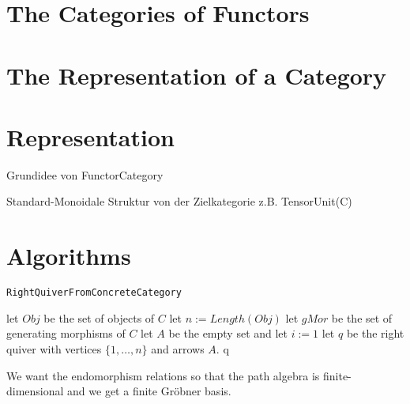 \documentclass{article}
\theoremstyle{definition}
\def \pkgpath {C:/Users/Tibor/AppData/Local/Packages/CanonicalGroupLimited.UbuntuonWindows_79rhkp1fndgsc/LocalState/rootfs/home/user/.gap/pkg}
\begin{document}
\section{The Categories of Functors}

\section{The Representation of a Category}

\section{Representation}

Grundidee von FunctorCategory

Standard-Monoidale Struktur von der Zielkategorie z.B. TensorUnit(C)

\section{Algorithms}


\begin{algorithm}\capstart
    \caption{\texttt{RightQuiverFromConcreteCategory}}\label{algo:RightQuiverFromConcreteCategory}
	\BlankLine
	let $Obj$ be the set of objects of $C$\;
	let $n := Length(Obj)$\;
	let $gMor$ be the set of generating morphisms of $C$\;
	let $A$ be the empty set and let $i := 1$\;
	\BlankLine
	let $q$ be the right quiver with vertices $\{1,\dots,n\}$ and arrows $A$.
	\BlankLine
	\Return q\;
\end{algorithm}

We want the endomorphism relations so that the path algebra is finite-dimensional and we
get a finite Gröbner basis.
\end{document}

